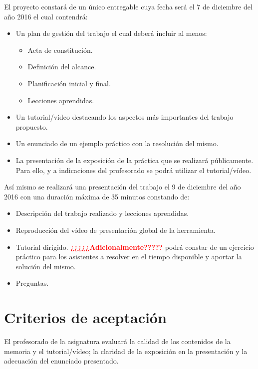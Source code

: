 \documentclass[a4paper,10pt]{scrartcl}
\begin{document}
El proyecto constará de un único entregable cuya fecha será el 7 de diciembre del año 2016 el cual contendrá:
	\begin{itemize}
		\item Un plan de gestión del trabajo el cual deberá incluir al menos:
		
		\begin{itemize}
			\item Acta de constitución.
			\item Definición del alcance.
			\item Planificación inicial y final.
			\item Lecciones aprendidas.
		\end{itemize}
		
		\item Un tutorial/vídeo destacando los aspectos más importantes del trabajo propuesto.
		
		\item Un enunciado de un ejemplo práctico con la resolución del mismo.
		
		\item La presentación de la exposición de la práctica que se realizará públicamente. Para ello, y a indicaciones del profesorado se podrá utilizar el tutorial/vídeo.		
	\end{itemize}

Así mismo se realizará una presentación del trabajo el 9 de diciembre del año 2016 con una duración máxima de 35 minutos constando de:
\begin{itemize}
	\item Descripción del trabajo realizado y lecciones aprendidas.
	
	\item Reproducción del vídeo de presentación global de la herramienta.
	
	\item Tutorial dirigido. \textbf{\textcolor{red}{¿¿¿¿¿Adicionalmente?????}} podrá constar de un ejercicio práctico para los asistentes a resolver en el tiempo disponible y aportar la solución del mismo.

	\item Preguntas.


\end{itemize}

\section{Criterios de aceptación}
El profesorado de la asignatura evaluará la calidad de los contenidos de la memoria y el tutorial/vídeo; la claridad de la exposición en la presentación y la adecuación del enunciado presentado.
\end{document}
